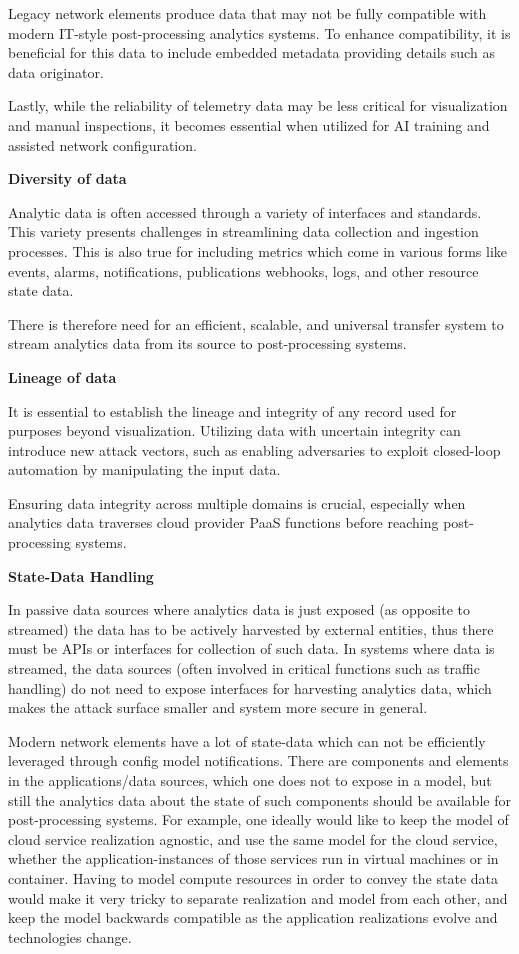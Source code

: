 \documentclass[10pt,sigconf]{iabart}
\begin{document}
Legacy network elements produce data that may not be fully compatible with modern IT-style post-processing analytics systems. To enhance compatibility, it is beneficial for this data to include embedded metadata providing details such as data originator.

Lastly, while the reliability of telemetry data may be less critical for visualization and manual inspections, it becomes essential when utilized for AI training and assisted network configuration.

\textbf{Diversity of data} 

Analytic data is often accessed through a variety of interfaces and standards. This variety presents challenges in streamlining data collection and ingestion processes. This is also true for including metrics which come in various forms like events, alarms, notifications, publications webhooks, logs, and other resource state data.

There is therefore need for an efficient, scalable, and universal transfer system to stream analytics data from its source to post-processing systems.

\textbf{Lineage of data}

It is essential to establish the lineage and integrity of any record used for purposes beyond visualization. Utilizing data with uncertain integrity can introduce new attack vectors, such as enabling adversaries to exploit closed-loop automation by manipulating the input data. 

Ensuring data integrity across multiple domains is crucial, especially when analytics data traverses cloud provider PaaS functions before reaching post-processing systems.

\textbf{State-Data Handling}

In passive data sources where analytics data is just exposed (as opposite to streamed) the data has to be actively harvested by external entities, thus there must be APIs or interfaces for collection of such data. In systems where data is streamed, the data sources (often involved in critical functions such as traffic handling) do not need to expose interfaces for harvesting analytics data, which makes the attack surface smaller and system more secure in general.

Modern network elements have a lot of state-data which can not be efficiently leveraged through config model notifications. There are components and elements in the applications/data sources, which one does not to expose in a model, but still the analytics data about the state of such components should be available for post-processing systems. For example, one ideally would like to keep the model of cloud service realization agnostic, and use the same model for the cloud service, whether the application-instances of those services run in virtual machines or in container. Having to model compute resources in order to convey the state data would make it very tricky to separate realization and model from each other, and keep the model backwards compatible as the application realizations evolve and technologies change.
\end{document}
